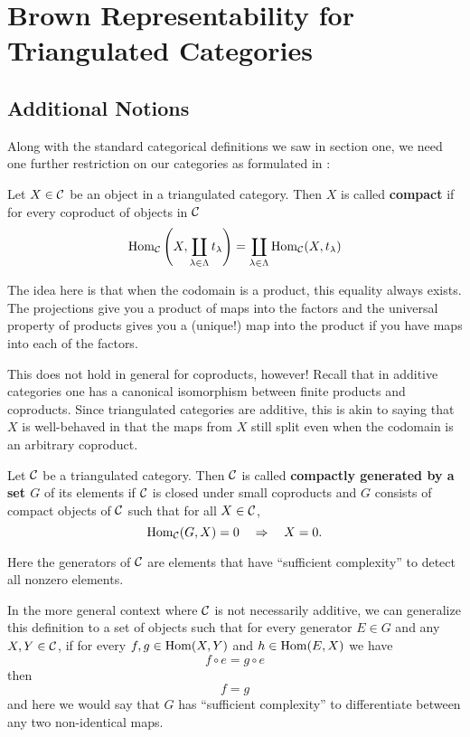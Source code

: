 \documentclass[12pt]{article}
\begin{document}
\section{Brown Representability for Triangulated Categories}
\subsection{Additional Notions}
Along with the standard categorical definitions we saw in section one, we need one further restriction on our categories as formulated in \cite{neeman-article}:
\begin{defn}
	Let $X\in\mathcal{C}$ be an object in a triangulated category. Then $X$ is called \textbf{compact} if for every coproduct of objects in $\mathcal{C}$
	\[\operatorname{Hom}_{\mathcal{C}}\left(X,\coprod_{\lambda\in\Lambda}t_\lambda\right)=\coprod_{\lambda\in\Lambda}\operatorname{Hom}_{\mathcal{C}}(X,t_\lambda)\]
\end{defn}
\begin{rmk}
	The idea here is that when the codomain is a product, this equality always exists. The projections give you 
	a product of maps into the factors and the universal property of products gives you a (unique!) map into the product if you
	have maps into each of the factors.

	This does not hold in general for coproducts, however! Recall that in additive categories 
	one has a canonical isomorphism between finite products and coproducts. Since triangulated 
	categories are additive, this is akin to saying that $X$ is well-behaved in that the maps 
	from $X$ still split even when the codomain is an arbitrary coproduct.
\end{rmk}
\begin{defn}
	Let $\mathcal{C}$ be a triangulated category. Then $\mathcal{C}$ is called \textbf{compactly generated by a set $G$} of its elements 
	if $\mathcal{C}$ is closed under small coproducts and $G$ consists of compact objects of $\mathcal{C}$ such that for all $X\in\mathcal{C}$,
	\[\operatorname{Hom}_{\mathcal{C}}(G,X)=0\quad\Rightarrow\quad X=0.\]
\end{defn}
\begin{rmk}
	Here the generators of $\mathcal{C}$ are elements that have ``sufficient complexity'' to detect all nonzero elements. 
	
	In the more general context where $\mathcal{C}$ is not necessarily additive, we can generalize this definition to a set of objects 
	such that for every generator $E\in G$ and any $X,Y\in\mathcal{C}$, if for every $f,g\in\operatorname{Hom}(X,Y)$ and $h\in\operatorname{Hom}(E,X)$ we have 
	\[f\circ e=g\circ e\]
	then 
	\[f=g\]
	and here we would say that $G$ has ``sufficient complexity'' to differentiate between any two non-identical maps.
\end{rmk}
\end{document}
